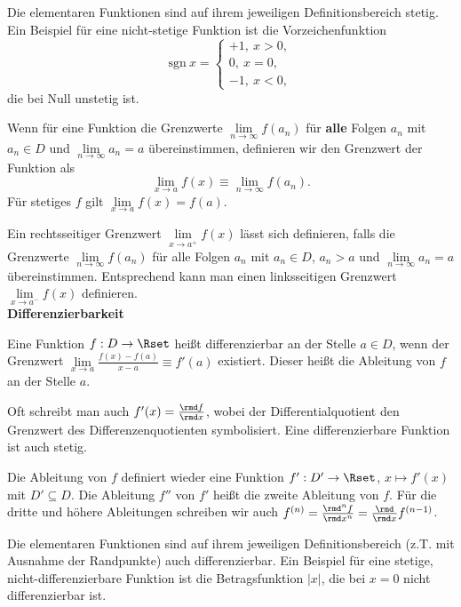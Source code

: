 \documentclass[a4paper,10pt]{article}
\begin{document}
Die elementaren Funktionen sind auf ihrem jeweiligen Definitionsbereich
stetig.
Ein Beispiel für eine nicht-stetige Funktion ist die Vorzeichenfunktion
\[
\textrm{sgn}~x=\left\{\begin{array}{l}+1,~x>0,\\0,~x=0,\\-1,~x<0,\end{array}\right.
\]
die bei Null unstetig ist.

Wenn für eine Funktion die Grenzwerte $\lim\limits_{n\to\infty} f(a_n)$
für {\bf alle} Folgen $a_n$ mit $a_n\in D$ und $\lim\limits_{n\to\infty} a_n=a$
übereinstimmen, definieren wir den Grenzwert der Funktion als
\[
\lim\limits_{x\to a} f(x)\equiv \lim\limits_{n\to\infty} f(a_n).
\]
Für stetiges $f$ gilt $\lim\limits_{x\to a} f(x)=f(a)$.

Ein rechtsseitiger Grenzwert $\lim\limits_{x\to a^+} f(x)$
lässt sich definieren, falls
die Grenzwerte $\lim\limits_{n\to\infty} f(a_n)$ für alle Folgen $a_n$
mit $a_n\in D$, $a_n>a$ und $\lim\limits_{n\to\infty} a_n=a$ übereinstimmen.
Entsprechend kann man einen linksseitigen Grenzwert
$\lim\limits_{x\to a^-} f(x)$ definieren.\\

{\bf Differenzierbarkeit}

Eine Funktion $f:D\to\Rset$ heißt differenzierbar an der Stelle $a\in D$,
wenn der Grenzwert $\lim\limits_{x\to a}\frac{f(x)-f(a)}{x-a}\equiv f'(a)$
existiert.
Dieser heißt die Ableitung von $f$ an der Stelle $a$.

Oft schreibt man auch $f'(x)=\frac{\rmd f}{\rmd x}$, wobei der
Differentialquotient den Grenzwert des Differenzenquotienten symbolisiert.
Eine differenzierbare Funktion ist auch stetig.

Die Ableitung von $f$ definiert wieder eine Funktion $f':D'\to \Rset$,
$x\mapsto f'(x)$ mit $D'\subseteq D$.
Die Ableitung $f''$ von $f'$ heißt die zweite Ableitung von $f$.
      Für die dritte und höhere Ableitungen schreiben wir auch
      $f^{(n)} = \frac{\rmd^nf}{\rmd x^n} = \frac{\rmd}{\rmd x}f^{(n-1)}$.

Die elementaren Funktionen
sind auf ihrem jeweiligen Definitionsbereich (z.T. mit Ausnahme der Randpunkte)
auch differenzierbar.
Ein Beispiel für eine stetige, nicht-differenzierbare Funktion ist
die Betragsfunktion $|x|$, die bei $x=0$ nicht differenzierbar ist.
\end{document}
